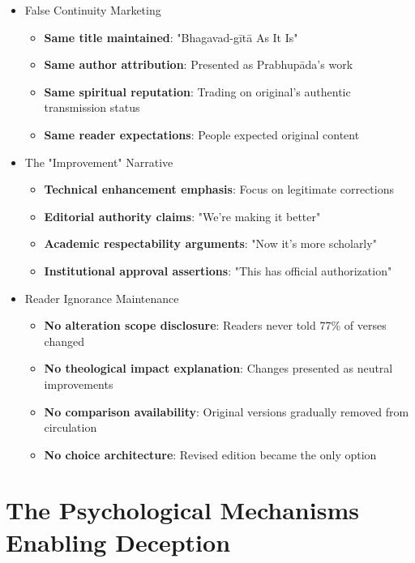 \documentclass[11pt,twoside]{book}
\begin{document}
\begin{itemize}
\item False Continuity Marketing
\label{sec:org90148e3}
\begin{itemize}
\item \textbf{\textbf{Same title maintained}}: "Bhagavad-gītā As It Is"
\item \textbf{\textbf{Same author attribution}}: Presented as Prabhupāda's work
\item \textbf{\textbf{Same spiritual reputation}}: Trading on original's authentic transmission status
\item \textbf{\textbf{Same reader expectations}}: People expected original content
\end{itemize}
\item The "Improvement" Narrative
\label{sec:orgf257154}
\begin{itemize}
\item \textbf{\textbf{Technical enhancement emphasis}}: Focus on legitimate corrections
\item \textbf{\textbf{Editorial authority claims}}: "We're making it better"
\item \textbf{\textbf{Academic respectability arguments}}: "Now it's more scholarly"
\item \textbf{\textbf{Institutional approval assertions}}: "This has official authorization"
\end{itemize}
\item Reader Ignorance Maintenance
\label{sec:org5b5feb4}
\begin{itemize}
\item \textbf{\textbf{No alteration scope disclosure}}: Readers never told 77\% of verses changed
\item \textbf{\textbf{No theological impact explanation}}: Changes presented as neutral improvements
\item \textbf{\textbf{No comparison availability}}: Original versions gradually removed from circulation
\item \textbf{\textbf{No choice architecture}}: Revised edition became the only option
\end{itemize}
\end{itemize}
\section*{The Psychological Mechanisms Enabling Deception}
\label{sec:org615e227}
\end{document}
